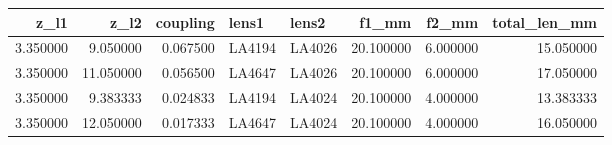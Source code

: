 \begin{tabular}{rrrllrrr}
\toprule
z_l1 & z_l2 & coupling & lens1 & lens2 & f1_mm & f2_mm & total_len_mm \\
\midrule
3.350000 & 9.050000 & 0.067500 & LA4194 & LA4026 & 20.100000 & 6.000000 & 15.050000 \\
3.350000 & 11.050000 & 0.056500 & LA4647 & LA4026 & 20.100000 & 6.000000 & 17.050000 \\
3.350000 & 9.383333 & 0.024833 & LA4194 & LA4024 & 20.100000 & 4.000000 & 13.383333 \\
3.350000 & 12.050000 & 0.017333 & LA4647 & LA4024 & 20.100000 & 4.000000 & 16.050000 \\
\bottomrule
\end{tabular}
